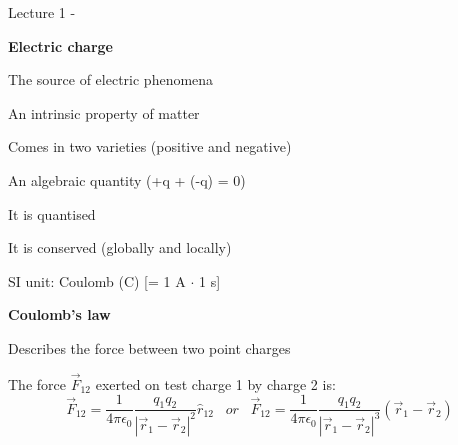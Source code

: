 \renewcommand{\summarizedlecture}{1 }

%
%
%

\begin{frame}{Lecture \summarizedlecture - \lecturesummarytitle}

\begin{itemize}
{\small
\item {\bf Electric charge}
  \begin{itemize}
  {\small
    \item The source of electric phenomena
    \item An intrinsic property of matter
    \item Comes in two varieties (positive and negative)
    \item An algebraic quantity (+q + (-q) = 0)
    \item It is quantised
    \item It is conserved (globally and locally)
    \item SI unit: Coulomb (C) [= 1 A $\cdot$ 1 s]
  }
  \end{itemize}

\vspace{0.2cm}

\item {\bf Coulomb's law}
  \begin{itemize}
  {\small
     \item Describes the force between two point charges
     \item The force $\vec{F}_{12}$ exerted on test charge 1 by charge 2 is:
     \begin{equation*}
       \vec{F}_{12} = \frac{1}{4\pi\epsilon_0} \frac{q_1 q_2}{|\vec{r}_{1}-\vec{r}_{2}|^{2}} \hat{r}_{12}
       \;\;\;
       or
       \;\;\;
       \vec{F}_{12} = \frac{1}{4\pi\epsilon_0} \frac{q_1 q_2}{|\vec{r}_{1}-\vec{r}_{2}|^{3}} (\vec{r}_{1}-\vec{r}_{2})
     \end{equation*}
  }
  \end{itemize}

}
\end{itemize}

\end{frame}


%
%
%

